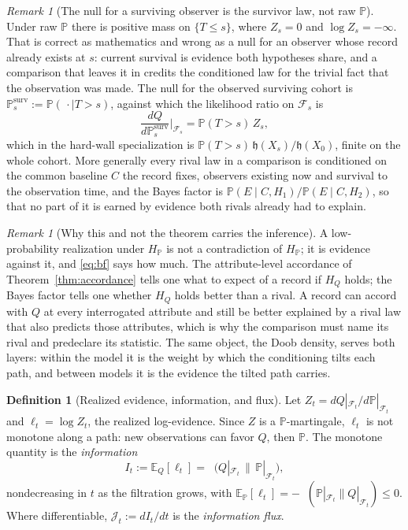 \documentclass[11pt]{article}
\newcommand{\E}{\mathbb{E}}
\newcommand{\PP}{\mathbb{P}}
\newcommand{\Fc}{\mathcal{F}}
\newcommand{\hm}{\mathfrak{h}}
\DeclareMathOperator{\KL}{D_{\mathrm{KL}}}
\theoremstyle{plain}
\theoremstyle{definition}
\newtheorem{definition}[theorem]{Definition}
\theoremstyle{remark}
\newtheorem{remark}[theorem]{Remark}
\begin{document}
\begin{remark}[The null for a surviving observer is the survivor law,
not raw $\PP$]\label{rem:survnull}
Under raw $\PP$ there is positive mass on $\{T\le s\}$, where
$Z_s=0$ and $\log Z_s=-\infty$. That is correct as mathematics and
wrong as a null for an observer whose record already exists at $s$:
current survival is evidence both hypotheses share, and a comparison
that leaves it in credits the conditioned law for the trivial fact that
the observation was made. The null for the observed surviving cohort is
$\PP^{\mathrm{surv}}_s:=\PP(\,\cdot\mid T>s)$, against which the
likelihood ratio on $\Fc_s$ is
\begin{equation}\label{eq:survlr}
\frac{dQ}{d\PP^{\mathrm{surv}}_s}\Big|_{\Fc_s}=\PP(T>s)\,Z_s,
\end{equation}
which in the hard-wall specialization is $\PP(T>s)\,\hm(X_s)/\hm(X_0)$,
finite on the whole cohort. More generally every rival law in a
comparison is conditioned on the common baseline $C$ the record fixes,
observers existing now and survival to the observation time, and the
Bayes factor is $\PP(E\mid C,H_1)/\PP(E\mid C,H_2)$, so that no part of
it is earned by evidence both rivals already had to explain.
\end{remark}

\begin{remark}[Why this and not the theorem carries the inference]
\label{rem:whybf}
A low-probability realization under $H_\PP$ is not a contradiction of
$H_\PP$; it is evidence against it, and \eqref{eq:bf} says how much. The
attribute-level accordance of Theorem~\ref{thm:accordance} tells one what
to expect of a record if $H_Q$ holds; the Bayes factor tells one whether
$H_Q$ holds better than a rival. A record can accord with $Q$ at every
interrogated attribute and still be better explained by a rival law that
also predicts those attributes, which is why the comparison must name its
rival and predeclare its statistic. The same object, the Doob density,
serves both layers: within the model it is the weight by which the
conditioning tilts each path, and between models it is the evidence the
tilted path carries.
\end{remark}

\begin{definition}[Realized evidence, information, and flux]\label{def:info}
Let $Z_t=dQ|_{\Fc_t}/d\PP|_{\Fc_t}$ and $\ell_t=\log Z_t$, the realized
log-evidence. Since $Z$ is a $\PP$-martingale, $\ell_t$ is not monotone
along a path: new observations can favor $Q$, then $\PP$. The monotone
quantity is the \emph{information}
\begin{equation}\label{eq:info}
I_t:=\E_Q[\ell_t]=\KL\bigl(Q|_{\Fc_t}\,\big\|\,\PP|_{\Fc_t}\bigr),
\end{equation}
nondecreasing in $t$ as the filtration grows, with
$\E_\PP[\ell_t]=-\KL(\PP|_{\Fc_t}\|Q|_{\Fc_t})\le0$. Where differentiable,
$\mathcal J_t:=dI_t/dt$ is the \emph{information flux}.
\end{definition}
\end{document}
